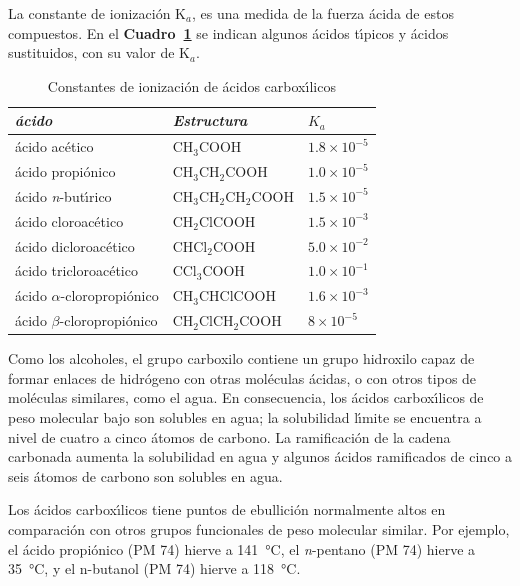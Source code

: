 La constante de ionizaci\'on K$_a$, es una medida de la fuerza \'acida de estos compuestos. En el \textbf{Cuadro~\ref{hcooh}} se indican algunos \'acidos t\'{\i}picos y \'acidos sustituidos, con su valor de K$_a$.
\begin{table}[hbt]
\caption{Constantes de ionizaci\'on de \'acidos carbox\'{\i}licos}
\label{hcooh}
\begin{center}
{\footnotesize \begin{tabular}{lll}\hline
\textit{\'acido} &\textit{Estructura}& $K_a$\\\hline
\'acido ac\'etico    &CH$_3$COOH              &$1.8\times10^{-5}$\\
\'acido propi\'onico &CH$_3$CH$_2$COOH        &$1.0\times10^{-5}$\\
\'acido \textit{n}-but\'{\i}rico&CH$_3$CH$_2$CH$_2$COOH 
&$1.5\times10^{-5}$\\
\'acido cloroac\'etico &CH$_2$ClCOOH  &$1.5\times10^{-3}$\\
\'acido dicloroac\'etico &CHCl$_2$COOH  &$5.0\times10^{-2}$\\
\'acido tricloroac\'etico &CCl$_3$COOH  &$1.0\times10^{-1}$\\
\'acido $\alpha$-cloropropi\'onico &CH$_3$CHClCOOH  &$1.6\times10^{-3}$\\
\'acido $\beta $-cloropropi\'onico &CH$_2$ClCH$_2$COOH 
&$8\times10^{-5}$\\[.05in]\hline
\end{tabular}
}
\end{center}
\end{table}
Como los alcoholes, el grupo  carboxilo contiene un grupo hidroxilo capaz de formar enlaces de hidr\'ogeno con otras mol\'eculas \'acidas, o con  otros tipos de mol\'eculas similares, como el agua. En consecuencia, los \'acidos carbox\'{\i}licos de peso molecular bajo son solubles en agua; la solubilidad l\'{\i}mite se encuentra a nivel de cuatro a cinco \'atomos de carbono. La ramificaci\'on de la cadena carbonada aumenta la solubilidad en agua y algunos \'acidos ramificados de cinco a seis \'atomos de carbono son solubles en agua.

Los \'acidos carbox\'{\i}licos tiene puntos de ebullici\'on normalmente altos en comparaci\'on con otros grupos funcionales de peso molecular similar. Por ejemplo, el \'acido propi\'onico (PM 74) hierve a \SI{141}{\celsius}, el \textit{n}-pentano (PM 74) hierve a \SI{35}{\celsius}, y el n-butanol (PM 74) hierve a \SI{118}{\celsius}. 

